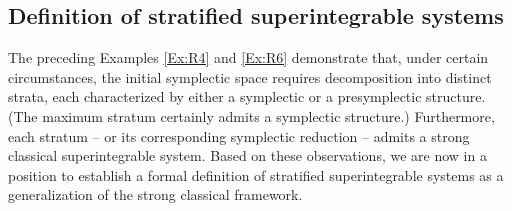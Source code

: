\documentclass[12pt]{amsart}
\theoremstyle{definition}
\numberwithin{equation}{section}
\begin{document}
  
 
 \subsection{Definition of stratified superintegrable systems}
 The preceding Examples \ref{Ex:R4} and \ref{Ex:R6} demonstrate that, under certain circumstances, the initial symplectic space requires decomposition into distinct strata, each characterized by either a symplectic or a presymplectic structure. (The maximum stratum certainly admits a symplectic structure.)  Furthermore,   each stratum -- or its corresponding symplectic reduction -- admits a strong classical superintegrable system. Based on these observations, we are now in a position to establish a formal definition of stratified superintegrable systems as a generalization of the strong classical framework.
 
\end{document}
